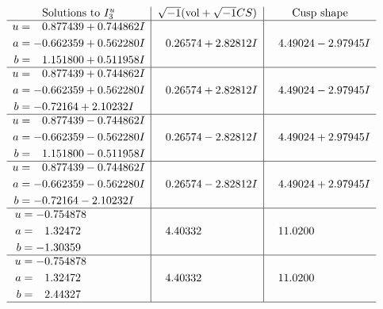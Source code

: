 \documentclass[1p]{elsarticle_modified}
\theoremstyle{definition}
\newcommand{\I}{\sqrt{-1}}
\begin{document}
$$\begin{array}{c|c|c}  
\text{Solutions to }I^u_{3}& \I (\text{vol} + \sqrt{-1}CS) & \text{Cusp shape}\\
 \hline 
\begin{aligned}
u &= \phantom{-}0.877439 + 0.744862 I \\
a &= -0.662359 + 0.562280 I \\
b &= \phantom{-}1.151800 + 0.511958 I\end{aligned}
 & \phantom{-}0.26574 + 2.82812 I & \phantom{-}4.49024 - 2.97945 I \\ \hline\begin{aligned}
u &= \phantom{-}0.877439 + 0.744862 I \\
a &= -0.662359 + 0.562280 I \\
b &= -0.72164 + 2.10232 I\end{aligned}
 & \phantom{-}0.26574 + 2.82812 I & \phantom{-}4.49024 - 2.97945 I \\ \hline\begin{aligned}
u &= \phantom{-}0.877439 - 0.744862 I \\
a &= -0.662359 - 0.562280 I \\
b &= \phantom{-}1.151800 - 0.511958 I\end{aligned}
 & \phantom{-}0.26574 - 2.82812 I & \phantom{-}4.49024 + 2.97945 I \\ \hline\begin{aligned}
u &= \phantom{-}0.877439 - 0.744862 I \\
a &= -0.662359 - 0.562280 I \\
b &= -0.72164 - 2.10232 I\end{aligned}
 & \phantom{-}0.26574 - 2.82812 I & \phantom{-}4.49024 + 2.97945 I \\ \hline\begin{aligned}
u &= -0.754878\phantom{ +0.000000I} \\
a &= \phantom{-}1.32472\phantom{ +0.000000I} \\
b &= -1.30359\phantom{ +0.000000I}\end{aligned}
 & \phantom{-}4.40332\phantom{ +0.000000I} & \phantom{-}11.0200\phantom{ +0.000000I} \\ \hline\begin{aligned}
u &= -0.754878\phantom{ +0.000000I} \\
a &= \phantom{-}1.32472\phantom{ +0.000000I} \\
b &= \phantom{-}2.44327\phantom{ +0.000000I}\end{aligned}
 & \phantom{-}4.40332\phantom{ +0.000000I} & \phantom{-}11.0200\phantom{ +0.000000I}\\
 \hline 
 \end{array}$$\newpage
\end{document}
